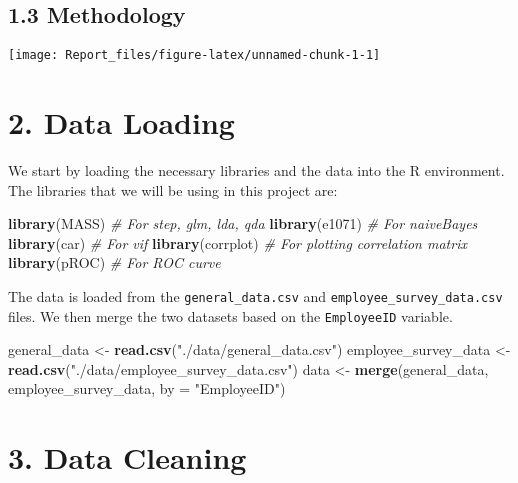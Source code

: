 \documentclass[
]{article}
\newenvironment{Shaded}{\begin{snugshade}}{\end{snugshade}}
\newcommand{\AttributeTok}[1]{\textcolor[rgb]{0.13,0.29,0.53}{#1}}
\newcommand{\CommentTok}[1]{\textcolor[rgb]{0.56,0.35,0.01}{\textit{#1}}}
\newcommand{\FunctionTok}[1]{\textcolor[rgb]{0.13,0.29,0.53}{\textbf{#1}}}
\newcommand{\NormalTok}[1]{#1}
\newcommand{\OtherTok}[1]{\textcolor[rgb]{0.56,0.35,0.01}{#1}}
\newcommand{\StringTok}[1]{\textcolor[rgb]{0.31,0.60,0.02}{#1}}
\begin{document}
\hypertarget{methodology}{%
\subsection{1.3 Methodology}\label{methodology}}

\begin{center}\texttt{[image: Report\_files/figure-latex/unnamed-chunk-1-1]} \end{center}

\hypertarget{data-loading}{%
\section{2. Data Loading}\label{data-loading}}

We start by loading the necessary libraries and the data into the R
environment. The libraries that we will be using in this project are:

\begin{Shaded}
\begin{Highlighting}[]
\FunctionTok{library}\NormalTok{(MASS) }\CommentTok{\# For step, glm, lda, qda}
\FunctionTok{library}\NormalTok{(e1071) }\CommentTok{\# For naiveBayes}
\FunctionTok{library}\NormalTok{(car) }\CommentTok{\# For vif}
\FunctionTok{library}\NormalTok{(corrplot) }\CommentTok{\# For plotting correlation matrix}
\FunctionTok{library}\NormalTok{(pROC) }\CommentTok{\# For ROC curve}
\end{Highlighting}
\end{Shaded}

The data is loaded from the \texttt{general\_data.csv} and
\texttt{employee\_survey\_data.csv} files. We then merge the two
datasets based on the \texttt{EmployeeID} variable.

\begin{Shaded}
\begin{Highlighting}[]
\NormalTok{general\_data }\OtherTok{\textless{}{-}} \FunctionTok{read.csv}\NormalTok{(}\StringTok{"./data/general\_data.csv"}\NormalTok{)}
\NormalTok{employee\_survey\_data }\OtherTok{\textless{}{-}} \FunctionTok{read.csv}\NormalTok{(}\StringTok{"./data/employee\_survey\_data.csv"}\NormalTok{)}
\NormalTok{data }\OtherTok{\textless{}{-}} \FunctionTok{merge}\NormalTok{(general\_data, employee\_survey\_data, }\AttributeTok{by =} \StringTok{"EmployeeID"}\NormalTok{)}
\end{Highlighting}
\end{Shaded}

\hypertarget{data-cleaning}{%
\section{3. Data Cleaning}\label{data-cleaning}}
\end{document}
